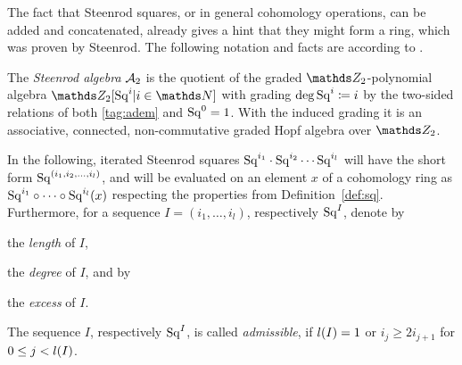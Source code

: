 The fact that Steenrod squares, or in general cohomology operations,
can be added and concatenated, already gives a hint that they might
form a ring, which was proven by Steenrod. The following notation and
facts are according to \cite[Chap.~6]{mosher}.
\begin{Def}
  The \emph{Steenrod algebra} $\mathcal{A}_2$ is the quotient
  of the graded $\Zmod2$-polynomial algebra
  $\Zmod2[\Sq i|i\in\Nat]$ with grading $\deg \mathrm{Sq}^{i}\coloneqq i$
  by the two-sided relations of both \ref{tag:adem} and $\mathrm{Sq}^{0}=1$.
  With the induced grading it is an associative, connected,
  non-commutative graded Hopf algebra over $\Zmod2$.
\end{Def}
\begin{Not}
  In the following, iterated Steenrod squares
  $\mathrm{Sq}^{i_1}\cdot\mathrm{Sq}^{i_2}\dotsm\mathrm{Sq}^{i_l}$ will have the short form
  $\mathrm{Sq}^{(i_1,i_2,\dotsc,i_l)}$,
  and will be evaluated on an element $x$ of a cohomology ring as
  $\mathrm{Sq}^{i_1}\circ\dotsb\circ\mathrm{Sq}^{i_l}(x)$ respecting the
  properties from Definition~\ref{def:sq}.
  Furthermore, for a sequence $I=(i_1,\dotsc,i_l)$,
  respectively $\mathrm{Sq}^{I}$, denote by
  \begin{description}[labelindent=1em]
  \item[$\l(I)\coloneqq l$] the \emph{length} of $I$,
  \item[$\d(I)\coloneqq \sum_{j=0}^{l} i_j$] the \emph{degree} of $I$,
    and by
  \item[$\e(I)\coloneqq 2i_1-\d(I)=\sum_{j=1}^{l-1}(i_j-2i_{j+1})$]
    the \emph{excess} of $I$.
  \end{description}
  The sequence $I$, respectively $\mathrm{Sq}^{I}$, is called \emph{admissible},
  if $l(I)=1$ or $i_j\geq 2i_{j+1}$ for $0\leq j<l(I)$.
\end{Not}

